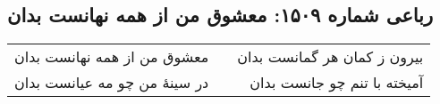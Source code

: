 \begin{center}
\section*{رباعی شماره ۱۵۰۹: معشوق من از همه نهانست بدان}
\label{sec:1509}
\begin{longtable}{l p{0.5cm} r}
معشوق من از همه نهانست بدان
&&
بیرون ز کمان هر گمانست بدان
\\
در سینهٔ من چو مه عیانست بدان
&&
آمیخته با تنم چو جانست بدان
\\
\end{longtable}
\end{center}
